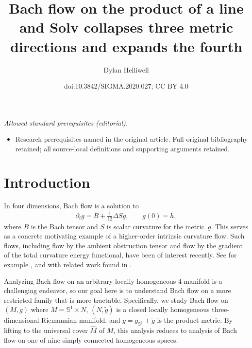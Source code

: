 \documentclass[10pt,a4paper]{amsart}
\title{Bach flow on the product of a line and Solv collapses three metric directions and expands the fourth}
\author{Dylan Helliwell}
\date{doi:10.3842/SIGMA.2020.027; CC BY 4.0}
\numberwithin{equation}{section}
\newcommand{\dvar}[1]{\partial_{#1}} %
\begin{document}
\maketitle
\noindent\textit{Allowed standard prerequisites (editorial).}\begin{itemize}
\item Research prerequisites named in the original article. Full original bibliography retained; all source-local definitions and supporting arguments retained.
\end{itemize}\medskip
\section{Introduction}

In four dimensions, Bach flow is a solution to
\begin{gather*}
\dvar{t} g = B + \frac{1}{12} \Delta S g, \qquad g(0) = h,
\end{gather*}
where $B$ is the Bach tensor and $S$ is scalar curvature for the metric~$g$. This serves as a concrete motivating example of a higher-order intrinsic curvature flow. Such flows, including flow by the ambient obstruction tensor and flow by the gradient of the total curvature energy functional, have been of interest recently. See for example \cite{BahuaudHelliwell1,BahuaudHelliwell2}, and with related work found in \cite{Bour,Ho,Lopez, Streets}.

Analyzing Bach flow on an arbitrary locally homogeneous 4-manifold is a challenging endeavor, so our goal here is to understand Bach flow on a more restricted family that is more tractable. Specifically, we study Bach flow on $(M, g)$ where $M = \mathbb{S}^1 \times N$, $(N, \tilde{g})$ is a closed locally homogeneous three-dimensional Riemannian manifold, and $g = g_{\mathbb{S}^1} + \tilde{g}$ is the product metric. By lifting to the universal cover $\widehat{M}$ of $M$, this analysis reduces to analysis of Bach flow on one of nine simply connected homogeneous spaces.
\end{document}
